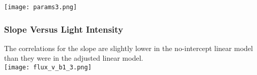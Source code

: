\documentclass[12pt]{article}
\begin{document}
\indent\indent \texttt{[image: params3.png]}

\pagebreak
\subsubsection{Slope Versus Light Intensity}
The correlations for the slope are slightly lower in the no-intercept linear model than they were in the adjusted linear model.\\
\indent\indent \texttt{[image: flux\_v\_b1\_3.png]}

\end{document}
